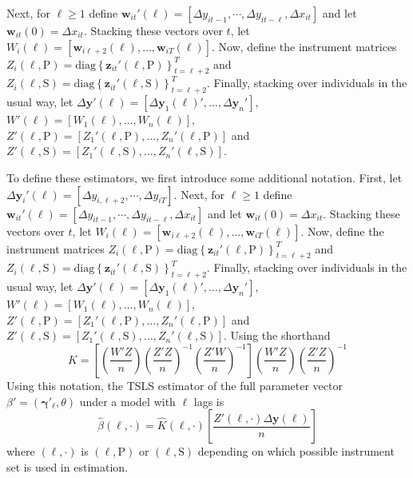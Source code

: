 Next, for $\ell \geq 1$ define $\mathbf{w}_{it}'(\ell) = [\Delta y_{it-1}, \cdots, \Delta y_{it-\ell}, \Delta x_{it}]$ and let $\mathbf{w}_{it}(0) = \Delta x_{it}$.
Stacking these vectors over $t$, let $W_i(\ell) = [\mathbf{w}_{i\ell+2}(\ell), \hdots, \mathbf{w}_{iT}(\ell)]$.
Now, define the instrument matrices $Z_i(\ell,\mbox{P}) = \mbox{diag}\left\{ \mathbf{z}_{it}'(\ell,\mbox{P}) \right\}_{t=\ell+2}^T$ and $Z_i(\ell,\mbox{S}) = \mbox{diag}\left\{ \mathbf{z}_{it}'(\ell,\mbox{S}) \right\}_{t=\ell+2}^T$.
Finally, stacking over individuals in the usual way, let $\Delta \mathbf{y}'(\ell) = [\Delta \mathbf{y}_1(\ell)', \hdots, \Delta \mathbf{y}_n']$,  $W'(\ell) = [W_1(\ell),\hdots, W_n(\ell)]$, $Z'(\ell,\mbox{P}) = \left[ Z_1'(\ell, \mbox{P}), \hdots, Z_n'(\ell,\mbox{P})\right]$ and $Z'(\ell,\mbox{S}) = \left[ Z_1'(\ell, \mbox{S}), \hdots, Z_n'(\ell,\mbox{S})\right]$.

To define these estimators, we first introduce some additional notation.
First, let $\Delta \mathbf{y}_{i}'(\ell) = [\Delta y_{i,\ell+2}, \cdots, \Delta y_{iT}]$.
Next, for $\ell \geq 1$ define $\mathbf{w}_{it}'(\ell) = [\Delta y_{it-1}, \cdots, \Delta y_{it-\ell}, \Delta x_{it}]$ and let $\mathbf{w}_{it}(0) = \Delta x_{it}$.
Stacking these vectors over $t$, let $W_i(\ell) = [\mathbf{w}_{i\ell+2}(\ell), \hdots, \mathbf{w}_{iT}(\ell)]$.
Now, define the instrument matrices $Z_i(\ell,\mbox{P}) = \mbox{diag}\left\{ \mathbf{z}_{it}'(\ell,\mbox{P}) \right\}_{t=\ell+2}^T$ and $Z_i(\ell,\mbox{S}) = \mbox{diag}\left\{ \mathbf{z}_{it}'(\ell,\mbox{S}) \right\}_{t=\ell+2}^T$.
Finally, stacking over individuals in the usual way, let $\Delta \mathbf{y}'(\ell) = [\Delta \mathbf{y}_1(\ell)', \hdots, \Delta \mathbf{y}_n']$,  $W'(\ell) = [W_1(\ell),\hdots, W_n(\ell)]$, $Z'(\ell,\mbox{P}) = \left[ Z_1'(\ell, \mbox{P}), \hdots, Z_n'(\ell,\mbox{P})\right]$ and $Z'(\ell,\mbox{S}) = \left[ Z_1'(\ell, \mbox{S}), \hdots, Z_n'(\ell,\mbox{S})\right]$.
Using the shorthand
\begin{equation}
  \widehat{K}= \left[ \left( \frac{W'Z}{n} \right)\left( \frac{Z'Z}{n} \right)^{-1}\left( \frac{Z'W}{n} \right)^{-1} \right]\left( \frac{W'Z}{n} \right)\left( \frac{Z'Z}{n} \right)^{-1}
\end{equation}
Using this notation, the TSLS estimator of the full parameter vector $\beta' = (\boldsymbol{\gamma}'_\ell, \theta)$ under a model with $\ell$ lags is
\begin{equation}
  \widehat{\beta}\left( \ell,\cdot \right) = \widehat{K}(\ell, \cdot) \left[ \frac{Z'(\ell,\cdot)\Delta \mathbf{y}(\ell)}{n} \right]
\end{equation}
where $(\ell, \cdot)$ is $(\ell, \mbox{P})$ or $(\ell, \mbox{S})$ depending on which possible instrument set is used in estimation.

